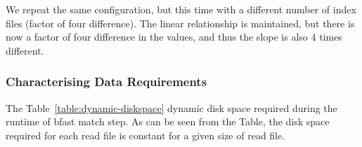 \documentclass{acm_proc_article-sp}
\begin{document}

We repeat the same configuration, but this time with a different
number of index files (factor of four difference).  The linear
relationship is maintained, but there is now a factor of four
difference in the values, and thus the slope is also 4 times
different.





 
\subsubsection{Characterising Data Requirements}


The Table~\ref{table:dynamic-diskspace} dynamic disk space required
during the runtime of bfast match step.  As can be seen from the
Table, the disk space required for each read file is constant for a
given size of read file.
\end{document}
